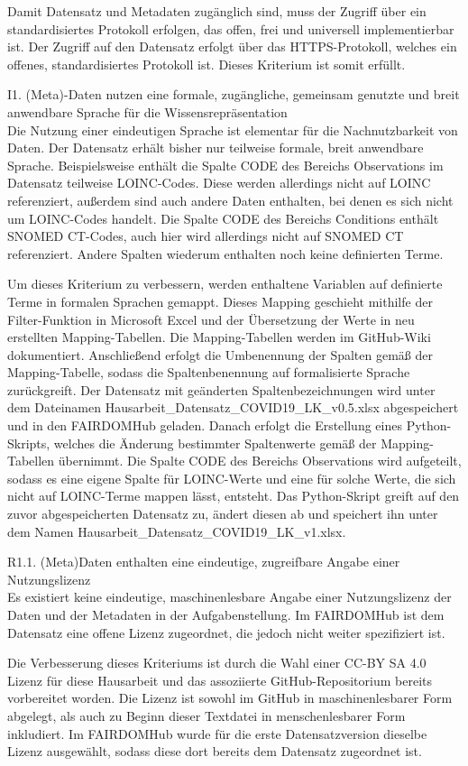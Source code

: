 \documentclass[12pt,a4paper,toc=bibliographynumbered,toc=indenttextentries]{scrreprt}
\begin{document}
\begin{description}
			Damit Datensatz und Metadaten zugänglich sind, muss der Zugriff über ein standardisiertes Protokoll erfolgen, das offen, frei und universell implementierbar ist.
			Der Zugriff auf den Datensatz erfolgt über das HTTPS-Protokoll, welches ein offenes, standardisiertes Protokoll ist. Dieses Kriterium ist somit erfüllt.
			\item I1. (Meta)-Daten nutzen eine formale, zugängliche, gemeinsam genutzte und breit anwendbare Sprache für die Wissensrepräsentation \\
			
			Die Nutzung einer eindeutigen Sprache ist elementar für die Nachnutzbarkeit von Daten. Der Datensatz erhält bisher nur teilweise formale, breit anwendbare Sprache. Beispielsweise enthält die Spalte CODE des Bereichs Observations im Datensatz teilweise LOINC-Codes. Diese werden allerdings nicht auf LOINC referenziert, außerdem sind auch andere Daten enthalten, bei denen es sich nicht um LOINC-Codes handelt. Die Spalte CODE des Bereichs Conditions enthält SNOMED CT-Codes, auch hier wird allerdings nicht auf SNOMED CT referenziert. Andere Spalten wiederum enthalten noch keine definierten Terme.\par
			Um dieses Kriterium zu verbessern, werden enthaltene Variablen auf definierte Terme in formalen Sprachen gemappt. Dieses Mapping geschieht mithilfe der Filter-Funktion in Microsoft Excel und der Übersetzung der Werte in neu erstellten Mapping-Tabellen. Die Mapping-Tabellen werden im GitHub-Wiki dokumentiert. Anschließend erfolgt die Umbenennung der Spalten gemäß der Mapping-Tabelle, sodass die Spaltenbenennung auf formalisierte Sprache zurückgreift. Der Datensatz mit geänderten Spaltenbezeichnungen wird unter dem Dateinamen \textsf{Hausarbeit\_Datensatz\_COVID19\_LK\_v0.5.xlsx} abgespeichert und in den FAIRDOMHub geladen. Danach erfolgt die Erstellung eines Python-Skripts, welches die Änderung bestimmter Spaltenwerte gemäß der Mapping-Tabellen übernimmt. Die Spalte CODE des Bereichs Observations wird aufgeteilt, sodass es eine eigene Spalte für LOINC-Werte und eine für solche Werte, die sich nicht auf LOINC-Terme mappen lässt, entsteht.
			Das Python-Skript greift auf den zuvor abgespeicherten Datensatz zu, ändert diesen ab und speichert ihn unter dem Namen \textsf{Hausarbeit\_Datensatz\_COVID19\_LK\_v1.xlsx}.
			\item R1.1. (Meta)Daten enthalten eine eindeutige, zugreifbare Angabe einer Nutzungslizenz \\
			
			Es existiert keine eindeutige, maschinenlesbare Angabe einer Nutzungslizenz der Daten und der Metadaten in der Aufgabenstellung. Im FAIRDOMHub ist dem Datensatz eine offene Lizenz zugeordnet, die jedoch nicht weiter spezifiziert ist.\par
			Die Verbesserung dieses Kriteriums ist durch die Wahl einer CC-BY SA 4.0 Lizenz für diese Hausarbeit und das assoziierte GitHub-Repositorium bereits vorbereitet worden. Die Lizenz ist sowohl im GitHub in maschinenlesbarer Form abgelegt, als auch zu Beginn dieser Textdatei in menschenlesbarer Form inkludiert.
			Im FAIRDOMHub wurde für die erste Datensatzversion dieselbe Lizenz ausgewählt, sodass diese dort bereits dem Datensatz zugeordnet ist. 
		\end{description}
\end{document}
